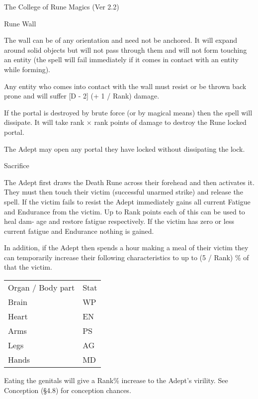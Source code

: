 \begin{Chapter}{The College of Rune Magics (Ver 2.2)}
\begin{spell}[S-11]{Rune Wall}
\begin{effects}
The wall can be of any orientation and need not be anchored.  It will
expand around solid objects but will not pass through them and will
not form touching an entity (the spell will fail immediately if it
comes in contact with an entity while forming).

Any entity who comes into contact with the wall must resist or be
thrown back prone and will suffer [D - 2] (+ 1 / Rank) damage.

If the portal is destroyed by brute force (or by magical means) then
the spell will dissipate. It will take rank × rank points of damage to
destroy the Rune locked portal.

The Adept may open any portal they have locked without dissipating the
lock.
\end{effects}
\end{spell}

\begin{spell}[S-12]{Sacrifice}

\begin{effects}
The Adept first draws the Death Rune across their forehead and then
activates it.  They must then touch their victim (successful unarmed
strike) and release the spell.  If the victim fails to resist the
Adept immediately gains all current Fatigue and Endurance from the
victim.  Up to Rank points each of this can be used to heal dam- age
and restore fatigue respectively.  If the victim has zero or less
current fatigue and Endurance nothing is gained.

In addition, if the Adept then spends a hour making a meal of their
victim they can temporarily increase their following characteristics
to up to (5 / Rank) \% of that the victim.

\begin{tabularx}{\columnwidth}{Xl}
Organ / Body part	& Stat  \\
Brain			& WP \\
Heart			& EN \\
Arms			& PS \\
Legs			& AG \\ 
Hands			& MD \\
\end{tabularx}

Eating the genitals will give a Rank\% increase to the Adept’s
virility.  See Conception (§4.8) for conception chances.


\end{effects}
\end{spell}
\end{Chapter}
